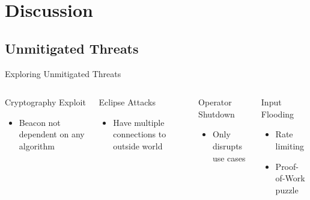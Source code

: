 \section{Discussion}


\subsection{Unmitigated Threats}

\begin{frame}{Exploring Unmitigated Threats}
    \begin{columns}[T,onlytextwidth]
        \pause

        \begin{block}{Cryptography Exploit}
            \begin{itemize}

                \item Beacon not dependent on any algorithm
            \end{itemize}
        \end{block}
        \pause
        \begin{block}{Eclipse Attacks}
            \begin{itemize}
                \item Have multiple connections to outside world
            \end{itemize}
        \end{block}

        \pause
        \begin{block}{Operator Shutdown}
            \begin{itemize}
                \item Only disrupts use cases
            \end{itemize}
        \end{block}

        \pause
        \begin{block}{Input Flooding}
          \begin{itemize}
              \item Rate limiting
              \item Proof-of-Work puzzle
          \end{itemize}
        \end{block}


\end{columns}
\end{frame}
